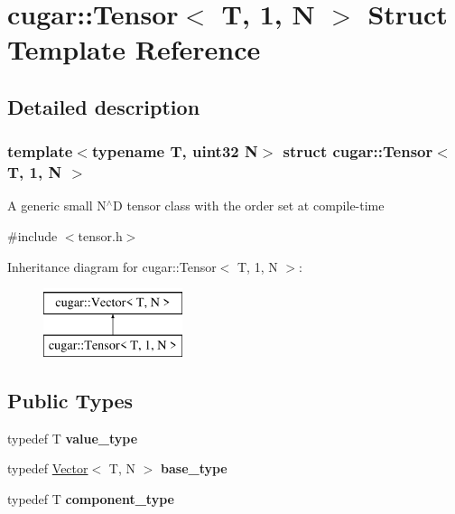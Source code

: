 \hypertarget{structcugar_1_1_tensor_3_01_t_00_011_00_01_n_01_4}{}\section{cugar\+:\+:Tensor$<$ T, 1, N $>$ Struct Template Reference}
\label{structcugar_1_1_tensor_3_01_t_00_011_00_01_n_01_4}


\subsection{Detailed description}
\subsubsection*{template$<$typename T, uint32 N$>$\newline
struct cugar\+::\+Tensor$<$ T, 1, N $>$}

A generic small N$^\wedge$D tensor class with the order set at compile-\/time 

{\ttfamily \#include $<$tensor.\+h$>$}

Inheritance diagram for cugar\+:\+:Tensor$<$ T, 1, N $>$\+:\begin{figure}[H]
\begin{center}
\leavevmode
\includegraphics[height=2.000000cm]{structcugar_1_1_tensor_3_01_t_00_011_00_01_n_01_4}
\end{center}
\end{figure}
\subsection*{Public Types}
\begin{DoxyCompactItemize}
\item 
\mbox{\label{structcugar_1_1_tensor_3_01_t_00_011_00_01_n_01_4_a7e4870164f80b56f5ec130d9a2463950}} 
typedef T {\bfseries value\+\_\+type}
\item 
\mbox{\label{structcugar_1_1_tensor_3_01_t_00_011_00_01_n_01_4_afe895bf0efb799c291357bbd0acc15f4}} 
typedef \hyperlink{structcugar_1_1_vector}{Vector}$<$ T, N $>$ {\bfseries base\+\_\+type}
\item 
\mbox{\label{structcugar_1_1_tensor_3_01_t_00_011_00_01_n_01_4_a1d1ddcdbd780231dfeeb76b83c003426}} 
typedef T {\bfseries component\+\_\+type}
\end{DoxyCompactItemize}
